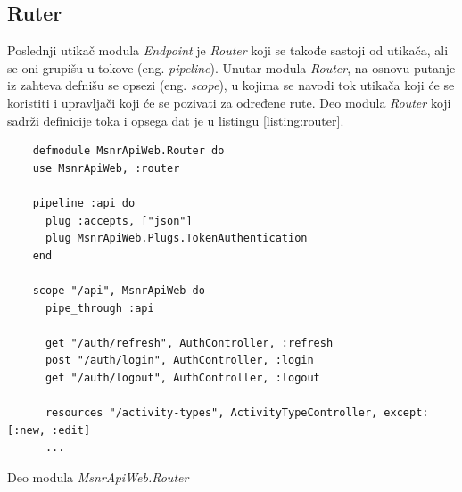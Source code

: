 \documentclass[12pt,oneside]{memoir}
\begin{document}
\subsection{Ruter}
Poslednji utikač modula \emph{Endpoint} je \emph{Router} koji se takođe sastoji od utikača, ali se oni grupišu
u tokove (eng. \emph{pipeline}). Unutar modula \emph{Router}, na osnovu putanje iz zahteva defnišu se opsezi
(eng. \emph{scope}), u kojima se navodi tok utikača koji će se koristiti i upravljači koji će se pozivati za određene rute.
Deo modula \emph{Router} koji sadrži definicije toka i opsega dat je u listingu \ref{listing:router}.
\begin{listing}[!h]
  \begin{verbatim}
    defmodule MsnrApiWeb.Router do
    use MsnrApiWeb, :router
  
    pipeline :api do
      plug :accepts, ["json"]
      plug MsnrApiWeb.Plugs.TokenAuthentication
    end
  
    scope "/api", MsnrApiWeb do
      pipe_through :api
  
      get "/auth/refresh", AuthController, :refresh
      post "/auth/login", AuthController, :login
      get "/auth/logout", AuthController, :logout
  
      resources "/activity-types", ActivityTypeController, except: [:new, :edit]
      ...
\end{verbatim}
\caption{Deo modula \emph{MsnrApiWeb.Router}}
\label{listing:router}
\end{listing}
\end{document}
